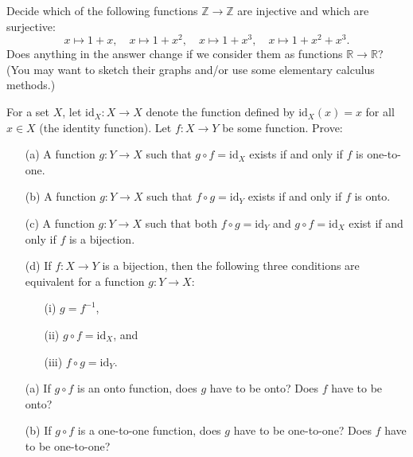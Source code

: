 \documentclass[11pt,paper=b5,footinclude,headinclude]{scrbook} %
\theoremstyle{remark}
\theoremstyle{definition} %
\theoremstyle{theorem} %
\newtheorem{ex}{Exercise\hypertarget{sol:\theex}}[chapter]
\begin{document}
\begin{ex}
Decide which of the following functions \( \mathbb{Z} \to \mathbb{Z} \) are injective and which are surjective:
\[
x \mapsto 1 + x, \quad x \mapsto 1 + x^2, \quad x \mapsto 1 + x^3, \quad x \mapsto 1 + x^2 + x^3.
\]
Does anything in the answer change if we consider them as functions \( \mathbb{R} \to \mathbb{R} \)? (You may want to sketch their graphs and/or use some elementary calculus methods.)
\end{ex}

\begin{ex}
For a set \( X \), let \( \text{id}_X : X \to X \) denote the function defined by \( \text{id}_X(x) = x \) for all \( x \in X \) (the identity function). Let \( f : X \to Y \) be some function. Prove:
\begin{enumerate}
    \item[(a)] A function \( g : Y \to X \) such that \( g \circ f = \text{id}_X \) exists if and only if \( f \) is one-to-one.
    \item[(b)] A function \( g : Y \to X \) such that \( f \circ g = \text{id}_Y \) exists if and only if \( f \) is onto.
    \item[(c)] A function \( g : Y \to X \) such that both \( f \circ g = \text{id}_Y \) and \( g \circ f = \text{id}_X \) exist if and only if \( f \) is a bijection.
    \item[(d)] If \( f : X \to Y \) is a bijection, then the following three conditions are equivalent for a function \( g : Y \to X \):
    \begin{enumerate}
        \item[(i)] \( g = f^{-1} \),
        \item[(ii)] \( g \circ f = \text{id}_X \), and
        \item[(iii)] \( f \circ g = \text{id}_Y \).
    \end{enumerate}
\end{enumerate}
\end{ex}

\begin{ex}
\begin{enumerate}
    \item[(a)] If \( g \circ f \) is an onto function, does \( g \) have to be onto? Does \( f \) have to be onto?
    \item[(b)] If \( g \circ f \) is a one-to-one function, does \( g \) have to be one-to-one? Does \( f \) have to be one-to-one?
\end{enumerate}
\end{ex}
\end{document}
